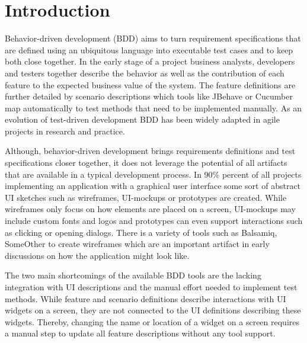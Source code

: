 \documentclass{sig-alternate-05-2015}
\begin{document}
%
%
\printccsdesc



\section{Introduction}
Behavior-driven development (BDD) aims to turn requirement specifications that are defined using an ubiquitous language into executable test cases and to keep both close together.
In the early stage of a project business analysts, developers and testers together describe the behavior as well as the contribution of each feature to the expected business value of the system.
The feature definitions are further detailed by scenario descriptions which tools like JBehave or Cucumber map automatically to test methods that need to be implemented manually.
As an evolution of test-driven development BDD has been widely adapted in agile projects in research and practice.

Although, behavior-driven development brings requirements definitions and test specifications closer together, it does not leverage the potential of all artifacts that are available in a typical development process.
In 90\% percent of all projects implementing an application with a graphical user interface some sort of abstract UI sketches such as wireframes, UI-mockups or prototypes are created.
While wireframes only focus on how elements are placed on a screen, UI-mockups may include custom fonts and logos and prototypes can even support interactions such as clicking or opening dialogs. 
There is a variety of tools such as Balsamiq, SomeOther to create wireframes which are an important artifact in early discussions on how the application might look like.

The two main shortcomings of the available BDD tools are the lacking integration with UI descriptions and the manual effort needed to implement test methods.
While feature and scenario definitions describe interactions with UI widgets on a screen, they are not connected to the UI definitions describing these widgets.
Thereby, changing the name or location of a widget on a screen requires a manual step to update all feature descriptions without any tool support.
\end{document}
